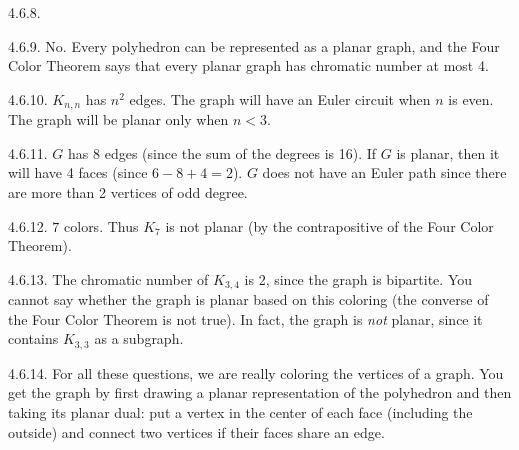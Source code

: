 \begin {itemize}
\begin{ans}{4.6.8.}
\end{ans}
\begin{ans}{4.6.9.}
		 No.  Every polyhedron can be represented as a planar graph, and the Four Color Theorem says that every planar graph has chromatic number at most 4.
	 
\end{ans}
\begin{ans}{4.6.10.}
  $K_{n,n}$ has $n^2$ edges.  The graph will have an Euler circuit when $n$ is even.  The graph will be planar only when $n < 3$.
  
\end{ans}
\begin{ans}{4.6.11.}
  $G$ has 8 edges (since the sum of the degrees is 16).  If $G$ is planar, then it will have 4 faces (since $6 - 8 + 4 = 2$).  $G$ does not have an Euler path since there are more than 2 vertices of odd degree.
  
\end{ans}
\begin{ans}{4.6.12.}
  $7$ colors.  Thus $K_7$ is not planar (by the contrapositive of the Four Color Theorem).
  
\end{ans}
\begin{ans}{4.6.13.}
  The chromatic number of $K_{3,4}$ is 2, since the graph is bipartite.  You cannot say whether the graph is planar based on this coloring (the converse of the Four Color Theorem is not true).  In fact, the graph is {\em not} planar, since it contains $K_{3,3}$ as a subgraph.
  
\end{ans}
\begin{ans}{4.6.14.}
		For all these questions, we are really coloring the vertices of a graph.  You get the graph by first drawing a planar representation of the polyhedron and then taking its planar dual: put a vertex in the center of each face (including the outside) and connect two vertices if their faces share an edge.
\end{ans}
\end{itemize}
